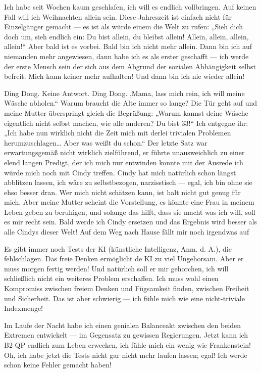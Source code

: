 Ich habe seit Wochen kaum geschlafen, ich will es endlich vollbringen. Auf keinen Fall will ich Weihnachten allein sein. Diese Jahreszeit ist einfach nicht für Einzelgänger gemacht — es ist als würde einem die Welt zu rufen: „Sieh dich doch um, sieh endlich ein: Du bist allein, du bleibst allein! Allein, allein, allein, allein!“ Aber bald ist es vorbei. Bald bin ich nicht mehr allein. Dann bin ich auf niemanden mehr angewiesen, dann habe ich es als erster geschafft — ich werde der erste Mensch sein der sich aus dem Abgrund der sozialen Abhängigkeit selbst befreit. Mich kann keiner mehr aufhalten! Und dann bin ich nie wieder allein!

Ding Dong. Keine Antwort. Ding Dong. ‚Mama, lass mich rein, ich will meine Wäsche abholen.“ Warum braucht die Alte immer so lange? Die Tür geht auf und meine Mutter überspringt gleich die Begrüßung: „Warum kannst deine Wäsche eigentlich nicht selbst machen, wie alle anderen? Du bist 33!“ Ich entgegne ihr: „Ich habe nun wirklich nicht die Zeit mich mit derlei trivialen Problemen herumzuschlagen… Aber was weißt du schon.“ Der letzte Satz war erwartungsgemäß nicht wirklich zielführend, er führte unausweichlich zu einer elend langen Predigt, der ich mich nur entwinden konnte mit der Ausrede ich würde mich noch mit Cindy treffen. Cindy hat mich natürlich schon längst abblitzen lassen, ich wäre zu selbstbezogen, narzisstisch — egal, ich bin ohne sie ehso besser dran. Wer mich nicht schätzen kann, ist halt nicht gut genug für mich. Aber meine Mutter scheint die Vorstellung, es könnte eine Frau in meinem Leben geben zu beruhigen, und solange das hilft, dass sie macht was ich will, soll es mir recht sein. Bald werde ich Cindy ersetzen und das Ergebnis wird besser als alle Cindys dieser Welt! Auf dem Weg nach Hause fällt mir noch irgendwas auf%

Es gibt immer noch Tests der KI (künstliche Intelligenz, Anm. d. A.), die fehlschlagen. Das freie Denken ermöglicht de KI zu viel Ungehorsam. Aber er muss morgen fertig werden! Und natürlich soll er mir gehorchen, ich will schließlich nicht ein weiteres Problem erschaffen. Ich muss wohl einen Kompromiss zwischen freiem Denken und Fügsamkeit finden, zwischen Freiheit und Sicherheit. Das ist aber schwierig — ich fühle mich wie eine nicht-triviale Indexmenge! %

Im Laufe der Nacht habe ich einen genialen Balanceakt zwischen den beiden Extremen entwickelt — im Gegensatz zu gewissen Regierungen. Jetzt kann ich B2-QP endlich zum Leben erwecken, ich fühle mich ein wenig wie Frankenstein! Oh, ich habe jetzt die Tests nicht gar nicht mehr laufen lassen; egal! Ich werde schon keine Fehler gemacht haben!

